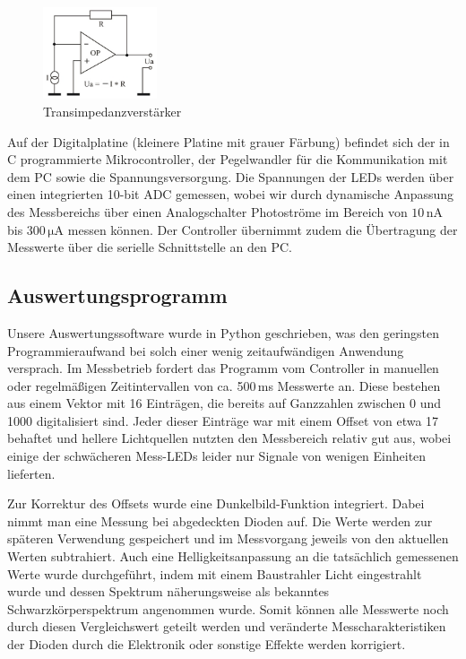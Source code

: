\documentclass[11pt]{scrartcl}
\newcommand{\unit}[1]{\ensuremath{\,\mathrm{#1}}} %
\begin{document}
\begin{figure}[H]
\begin{center}
\includegraphics[width=0.3\textwidth]{transimpedanz.png}
\end{center}
\vspace{-1.5\baselineskip}
\caption{Transimpedanzverstärker}
\label{fig:transimp}
\end{figure}

Auf der Digitalplatine (kleinere Platine mit grauer Färbung) befindet sich der in C programmierte Mikrocontroller, der Pegelwandler für die Kommunikation mit dem PC sowie die Spannungsversorgung. Die Spannungen der LEDs werden über einen integrierten 10-bit ADC gemessen, wobei wir durch dynamische Anpassung des Messbereichs über einen Analogschalter Photoströme im Bereich von $10 \unit{nA}$ bis $300 \unit{\mu A}$ messen können. Der Controller übernimmt zudem die Übertragung der Messwerte über die serielle Schnittstelle an den PC.


\subsection{Auswertungsprogramm} %
Unsere Auswertungssoftware wurde in Python geschrieben, was den geringsten Programmieraufwand bei solch einer wenig zeitaufwändigen Anwendung versprach.
Im Messbetrieb fordert das Programm vom Controller in manuellen oder regelmäßigen Zeitintervallen von ca. 500\,ms Messwerte an.
Diese bestehen aus einem Vektor mit 16 Einträgen, die bereits auf Ganzzahlen zwischen 0 und 1000 digitalisiert sind.
Jeder dieser Einträge war mit einem Offset von etwa 17 behaftet und hellere Lichtquellen nutzten den Messbereich relativ gut aus, wobei einige der schwächeren Mess-LEDs leider nur Signale von wenigen Einheiten lieferten.

Zur Korrektur des Offsets wurde eine Dunkelbild-Funktion integriert.
Dabei nimmt man eine Messung bei abgedeckten Dioden auf.
Die Werte werden zur späteren Verwendung gespeichert und im Messvorgang jeweils von den aktuellen Werten subtrahiert.
Auch eine Helligkeitsanpassung an die tatsächlich gemessenen Werte wurde durchgeführt, indem mit einem Baustrahler Licht eingestrahlt wurde und dessen Spektrum näherungsweise als bekanntes Schwarzkörperspektrum angenommen wurde.
Somit können alle Messwerte noch durch diesen Vergleichswert geteilt werden und veränderte Mess\-charakteristiken der Dioden durch die Elektronik oder sonstige Effekte werden korrigiert.
\end{document}
